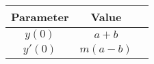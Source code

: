 \begin{tabular}{|c|c|c|}
    \hline
    \textbf{Parameter} &  \textbf{Value} \\
    \hline
     \(y(0)\)  &\(a + b\) \\
    \hline
     \(y'(0)\)  & \( m (a - b)\) \\
    \hline
  \end{tabular}
